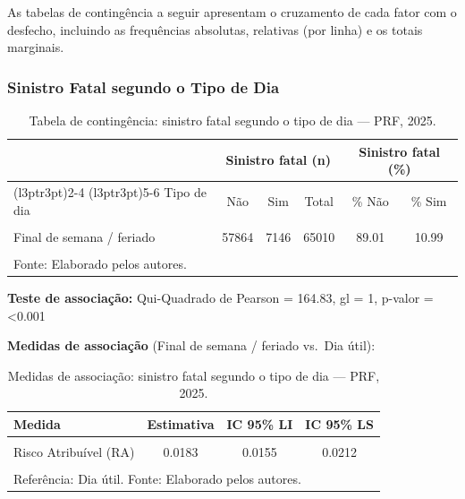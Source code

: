\documentclass[
  brazilian,
  12pt,
]{article}
\begin{document}
As tabelas de contingência a seguir apresentam o cruzamento de cada
fator com o desfecho, incluindo as frequências absolutas, relativas (por
linha) e os totais marginais.

\subsubsection{Sinistro Fatal segundo o Tipo de
Dia}\label{sinistro-fatal-segundo-o-tipo-de-dia}

\begingroup\fontsize{11}{13}\selectfont

\begin{longtable}[t]{lccccc}
\caption{\label{tab:tab9}Tabela de contingência: sinistro fatal segundo o tipo de dia — PRF, 2025.}\\
\toprule
\multicolumn{1}{c}{ } & \multicolumn{3}{c}{Sinistro fatal (n)} & \multicolumn{2}{c}{Sinistro fatal (\%)} \\
\cmidrule(l{3pt}r{3pt}){2-4} \cmidrule(l{3pt}r{3pt}){5-6}
Tipo de dia & Não & Sim & Total & \% Não & \% Sim\\
\midrule
\cellcolor{gray!10}{Dia útil} & \cellcolor{gray!10}{117741} & \cellcolor{gray!10}{11871} & \cellcolor{gray!10}{129612} & \cellcolor{gray!10}{90.84} & \cellcolor{gray!10}{9.16}\\
Final de semana / feriado & 57864 & 7146 & 65010 & 89.01 & 10.99\\
\textbf{\cellcolor{gray!10}{Total}} & \textbf{\cellcolor{gray!10}{175605}} & \textbf{\cellcolor{gray!10}{19017}} & \textbf{\cellcolor{gray!10}{194622}} & \textbf{\cellcolor{gray!10}{90.23}} & \textbf{\cellcolor{gray!10}{9.77}}\\
\bottomrule
\multicolumn{6}{l}{\rule{0pt}{1em}Fonte: Elaborado pelos autores.}\\
\end{longtable}
\endgroup{}

\textbf{Teste de associação:} Qui-Quadrado de Pearson = 164.83, gl = 1,
p-valor = \textless0.001

\textbf{Medidas de associação} (Final de semana / feriado vs.~Dia útil):

\begingroup\fontsize{11}{13}\selectfont

\begin{longtable}[t]{lccc}
\caption{\label{tab:tab9b}Medidas de associação: sinistro fatal segundo o tipo de dia — PRF, 2025.}\\
\toprule
Medida & Estimativa & IC 95\% LI & IC 95\% LS\\
\midrule
\cellcolor{gray!10}{Risco Relativo (RR)} & \cellcolor{gray!10}{1.2002} & \cellcolor{gray!10}{1.1673} & \cellcolor{gray!10}{1.2340}\\
Risco Atribuível (RA) & 0.0183 & 0.0155 & 0.0212\\
\cellcolor{gray!10}{Odds Ratio (OR)} & \cellcolor{gray!10}{1.2249} & \cellcolor{gray!10}{1.1875} & \cellcolor{gray!10}{1.2634}\\
\bottomrule
\multicolumn{4}{l}{\rule{0pt}{1em}Referência: Dia útil. Fonte: Elaborado pelos autores.}\\
\end{longtable}
\endgroup{}
\end{document}
